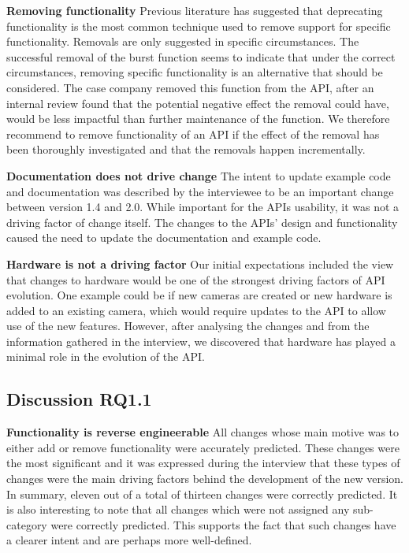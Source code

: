 \documentclass{sig-alternate}
\begin{document}
\smallskip \noindent
\textbf{Removing functionality  } %
Previous literature has suggested that deprecating functionality is the most common technique used to remove support for specific functionality. Removals are only suggested in specific circumstances. The successful removal of the burst function seems to indicate that under the correct circumstances, removing specific functionality is an alternative that should be considered. The case company removed this function from the API, after an internal review found that the potential negative effect the removal could have, would be less impactful than further maintenance of the function. We therefore recommend to remove functionality of an API if the effect of the removal has been thoroughly investigated and that the removals happen incrementally.

\smallskip \noindent
\textbf{Documentation does not drive change  } %
The intent to update example code and documentation was described by the interviewee to be an important change between version 1.4 and 2.0. While important for the APIs usability, it was not a driving factor of change itself. The changes to the APIs' design and functionality caused the need to update the documentation and example code.

\smallskip \noindent
\textbf{Hardware is not a driving factor  } %
Our initial expectations included the view that changes to hardware would be one of the strongest driving factors of API evolution. One example could be if new cameras are created or new hardware is added to an existing camera, which would require updates to the API to allow use of the new features. However, after analysing the changes and from the information gathered in the interview, we discovered that hardware has played a minimal role in the evolution of the API. 


\subsection{Discussion RQ1.1}

\noindent
\textbf{Functionality is reverse engineerable  } %
All changes whose main motive was to either add or remove functionality were accurately predicted. These changes were the most significant and it was expressed during the interview that these types of changes were the main driving factors behind the development of the new version. In summary, eleven out of a total of thirteen changes were correctly predicted. It is also interesting to note that all changes which were not assigned any sub-category were correctly predicted. This supports the fact that such changes have a clearer intent and are perhaps more well-defined.
\end{document}
